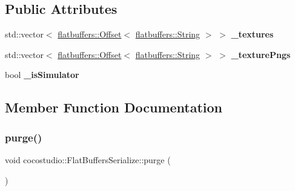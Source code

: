 \subsection*{Public Attributes}
\begin{DoxyCompactItemize}
\item 
\mbox{\label{classcocostudio_1_1FlatBuffersSerialize_a235fdc90a088cf3e9b13786c0863430c}} 
std\+::vector$<$ \hyperlink{structflatbuffers_1_1Offset}{flatbuffers\+::\+Offset}$<$ \hyperlink{structflatbuffers_1_1String}{flatbuffers\+::\+String} $>$ $>$ {\bfseries \+\_\+textures}
\item 
\mbox{\label{classcocostudio_1_1FlatBuffersSerialize_a84f3a515b43378f072e409abd1cf9e9e}} 
std\+::vector$<$ \hyperlink{structflatbuffers_1_1Offset}{flatbuffers\+::\+Offset}$<$ \hyperlink{structflatbuffers_1_1String}{flatbuffers\+::\+String} $>$ $>$ {\bfseries \+\_\+texture\+Pngs}
\item 
\mbox{\label{classcocostudio_1_1FlatBuffersSerialize_aee2ba6b064ee039e897819c188e5b0b5}} 
bool {\bfseries \+\_\+is\+Simulator}
\end{DoxyCompactItemize}


\subsection{Member Function Documentation}
\mbox{\label{classcocostudio_1_1FlatBuffersSerialize_ab01f64a6294feee2ebcbedc52a32ef14}} 
\subsubsection{\texorpdfstring{purge()}{purge()}\hspace{0.1cm}{\footnotesize\ttfamily [1/2]}}
{\footnotesize\ttfamily void cocostudio\+::\+Flat\+Buffers\+Serialize\+::purge (\begin{DoxyParamCaption}{ }\end{DoxyParamCaption})\hspace{0.3cm}{\ttfamily [static]}}

